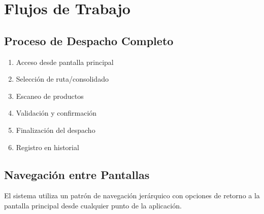 \documentclass[12pt,a4paper]{report}
\begin{document}
\chapter{Flujos de Trabajo}

\section{Proceso de Despacho Completo}
\begin{enumerate}
    \item Acceso desde pantalla principal
    \item Selección de ruta/consolidado
    \item Escaneo de productos
    \item Validación y confirmación
    \item Finalización del despacho
    \item Registro en historial
\end{enumerate}

\section{Navegación entre Pantallas}
El sistema utiliza un patrón de navegación jerárquico con opciones de retorno a la pantalla principal desde cualquier punto de la aplicación.
\end{document}
